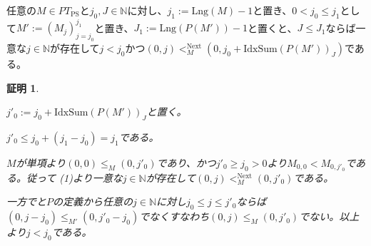 \documentclass[dvipdfmx,uplatex]{jsarticle}
\theoremstyle{customnonumberbreakfortheorem}
\theoremstyle{customnonumberbreakforproof}
\newtheorem{hideableproof}{証明}
\begin{document}
\begin{proposition}\label{切片の単項成分とNextの関係}
	任意の\(M \in PT_{\textrm{PS}}\)と\(j_0,J \in \mathbb{N}\)に対し、\(j_1 := \textrm{Lng}(M)-1\)と置き、\(0 < j_0 \leq j_1\)として\(M' := (M_j)_{j=j_0}^{j_1}\)と置き、\(J_1 := \textrm{Lng}(P(M'))-1\)と置くと、\(J \leq J_1\)ならば一意な\(j \in \mathbb{N}\)が存在して\(j < j_0\)かつ\((0,j) <_M^{\textrm{Next}} (0,j_0 + \textrm{IdxSum}(P(M'))_J)\)である。
\end{proposition}

\begin{hideableproof}
	\begin{indented}
		\item \(j'_0 := j_0 + \textrm{IdxSum}(P(M'))_J\)と置く。
		\item \(j'_0 \leq j_0 + (j_1-j_0) = j_1\)である。
		\item \(M\)が単項より\((0,0) \leq_M (0,j'_0)\)であり、かつ\(j'_0 \geq j_0 > 0\)より\(M_{0,0} < M_{0,j'_0}\)である。従って (1)より一意な\(j \in \mathbb{N}\)が存在して\((0,j) <_M^{\textrm{Next}} (0,j'_0)\)である。
		\item 一方でと\(P\)の定義から任意の\(j \in \mathbb{N}\)に対し\(j_0 \leq j \leq j'_0\)ならば\((0,j-j_0) \leq_{M'} (0,j'_0-j_0)\)でなくすなわち\((0,j) \leq_M (0,j'_0)\)でない。以上より\(j < j_0\)である。
	\end{indented}
\end{hideableproof}
\end{document}
